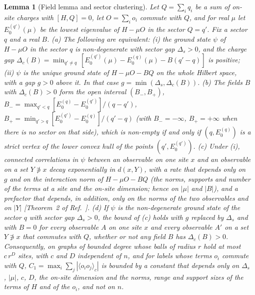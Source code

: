 \documentclass[aps,prx,onecolumn,10pt,nofootinbib,longbibliography,floatfix]{revtex4-2}
\newtheorem{lemma}{Lemma}
\theoremstyle{remark}
\begin{document}
\begin{lemma}[Field lemma and sector clustering]
\label{lem:field}
Let $Q=\sum_iq_i$ be a sum of on-site charges with $[H,Q]=0$, let $O=\sum_io_i$ commute with $Q$, and for real $\mu$
let $E_0^{(q')}(\mu)$ be the lowest eigenvalue of $H-\mu O$ in the sector $Q=q'$. Fix a sector $q$ and a real $B$.
(a) The following are equivalent: (i) the ground state $\psi$ of $H-\mu O$ in the sector $q$ is non-degenerate with
sector gap $\Delta_s>0$, and the \emph{charge gap}
$\Delta_c(B)=\min_{q'\neq q}\,[E_0^{(q')}(\mu)-E_0^{(q)}(\mu)-B(q'-q)]$ is positive; (ii) $\psi$ is the unique ground
state of $H-\mu O-BQ$ on the whole Hilbert space, with a gap $g>0$ above it. In that case
$g=\min(\Delta_s,\Delta_c(B))$.
(b) The fields $B$ with $\Delta_c(B)>0$ form the open interval $(B_-,B_+)$,
$B_-=\max_{q'<q}[E_0^{(q)}-E_0^{(q')}]/(q-q')$, $B_+=\min_{q'>q}[E_0^{(q')}-E_0^{(q)}]/(q'-q)$ (with $B_-=-\infty$,
$B_+=+\infty$ when there is no sector on that side), which is non-empty if and only if $(q,E_0^{(q)})$ is a strict
vertex of the lower convex hull of the points $(q',E_0^{(q')})$.
(c) Under (i), connected correlations in $\psi$ between an observable on one site $x$ and an observable on a set
$Y\not\ni x$ decay exponentially in $d(x,Y)$, with a rate that depends only on $g$ and on the interaction norm of
$H-\mu O-BQ$ (the norms, supports and number of the terms at a site and the on-site dimension; hence on $|\mu|$ and
$|B|$), and a prefactor that depends, in addition, only on the norms of the two observables and on $|Y|$
[Theorem~2 of Ref.~\cite{nachtergaele2006}]. %
(d) If $\psi$ is the non-degenerate ground state of the sector $q$ with sector gap $\Delta_s>0$, the bound of (c)
holds with $g$ replaced by $\Delta_s$ and with $B=0$ for every observable $A$ on one site $x$ and every observable
$A'$ on a set $Y\not\ni x$ that commutes with $Q$, whether or not any field $B$ has $\Delta_c(B)>0$. Consequently, on
graphs of bounded degree whose balls of radius $r$ hold at most $c\,r^{D}$ sites, with $c$ and $D$ independent of $n$,
and for labels whose terms $o_i$ commute with $Q$, $C_1=\max_i\sum_j|\langle o_io_j\rangle_c|$ is bounded by a constant
that depends only on $\Delta_s$, $|\mu|$, $c$, $D$, the on-site dimension and the norms, range and support sizes of
the terms of $H$ and of the $o_i$, and not on $n$.
\end{lemma}
\end{document}
